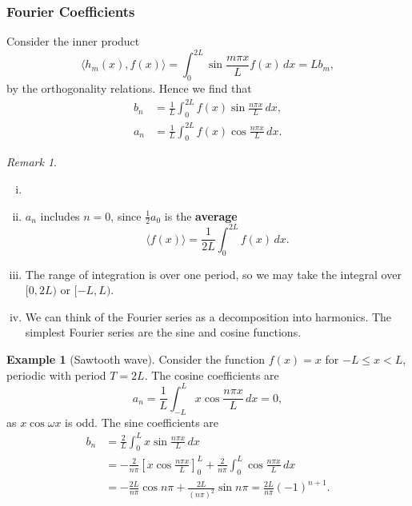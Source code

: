 \documentclass[12pt]{article}
\theoremstyle{definition}
\newtheorem{example}{Example}[section]
\theoremstyle{remark}
\newtheorem*{remark}{Remark}
\begin{document}
\subsubsection{Fourier Coefficients}%
\label{subsub:fourier_coefficients}

Consider the inner product
\[
	\langle h_m(x), f(x) \rangle = \int_{0}^{2L} \sin \frac{m \pi x}{L} f(x) \, dx = L b_m
,\]
by the orthogonality relations. Hence we find that
\begin{align*}
	b_n &= \frac{1}{L} \int_{0}^{2L}f(x) \sin \frac{n \pi x}{L} \, dx, \\
	a_n &= \frac{1}{L} \int_{0}^{2L}f(x) \cos \frac{n \pi x}{L} \, dx.
\end{align*}
\begin{remark}
	\begin{enumerate}[(i)]
		\item[]
		\item $a_n$ includes $n = 0$, since $\frac{1}{2} a_0$ is the \textbf{average}
			\[
				\langle f(x) \rangle = \frac{1}{2L} \int_{0}^{2L} f(x) \, dx
			.\]
		\item The range of integration is over one period, so we may take the integral over $[0, 2L)$ or $[-L, L)$.
		\item We can think of the Fourier series as a decomposition into harmonics. The simplest Fourier series are the sine and cosine functions.
	\end{enumerate}	
\end{remark}

\begin{adjustbox}{minipage = \columnwidth - 25.5pt, margin=1em, frame=1pt, margin=0em}
	\begin{example}[Sawtooth wave]
\item
	Consider the function $f(x) = x$ for $-L \leq x < L$, periodic with period $T = 2L$. The cosine coefficients are
	\[
	a_n = \frac{1}{L} \int_{-L}^{L} x \cos \frac{n \pi x}{L} \, dx = 0
	,\]
	as $x \cos \omega x$ is odd. The sine coefficients are
	\begin{align*}
		b_n &= \frac{2}{L} \int_{0}^{L} x \sin \frac{n \pi x}{L} \, dx \\
		    &= -\frac{2}{n \pi} \left[ x \cos \frac{n \pi x}{L} \right]_{0}^{L} + \frac{2}{n \pi} \int_{0}^{L} \cos \frac{n \pi x}{L} \, dx \\
		    &= - \frac{2L}{n \pi} \cos n \pi + \frac{2L}{(n \pi)^2} \sin n \pi = \frac{2L}{n \pi }(-1)^{n+1}.
	\end{align*}
	
\end{example}

\end{adjustbox}
\end{document}

